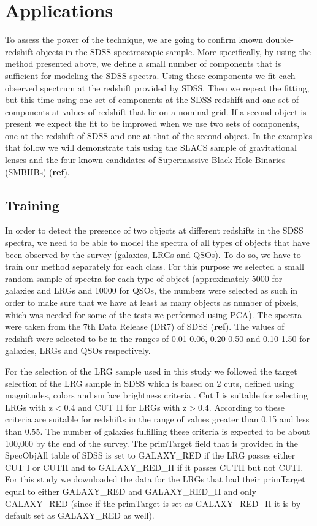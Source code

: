 \documentclass[12pt,preprint]{aastex}
\begin{document}
\section{Applications}\label{sec:applications}
To assess the power of the technique, we are going to confirm known
double-redshift objects in the SDSS spectroscopic sample. More
specifically, by using the method presented above, we define a small
number of components that is sufficient for modeling the SDSS
spectra. Using these components we fit each observed spectrum at the
redshift provided by SDSS. Then we repeat the fitting, but this time
using one set of components at the SDSS redshift and one set of
components at values of redshift that lie on a nominal grid. If a
second object is present we expect the fit to be improved when we use
two sets of components, one at the redshift of SDSS and one at that of
the second object. In the examples that follow we will demonstrate
this using the SLACS sample of gravitational lenses \citep{bolton} and
the four known candidates of Supermassive Black Hole Binaries (SMBHBs)
(\textbf{ref}).

\subsection{Training}\label{sec:training}
In order to detect the presence of two objects at different redshifts
in the SDSS spectra, we need to be able to model the spectra of all
types of objects that have been observed by the survey (galaxies, LRGs
and QSOs). To do so, we have to train our method separately for each
class. For this purpose we selected a small random sample of spectra
for each type of object (approximately 5000 for galaxies and LRGs and
10000 for QSOs, the numbers were selected as such in order to make
sure that we have at least as many objects as number of pixels, which
was needed for some of the tests we performed using PCA). The spectra
were taken from the 7th Data Release (DR7) of SDSS (\textbf{ref}). The
values of redshift were selected to be in the ranges of 0.01-0.06,
0.20-0.50 and 0.10-1.50 for galaxies, LRGs and QSOs respectively.

For the selection of the LRG sample used in this study we followed the
target selection of the LRG sample in SDSS which is based on 2 cuts,
defined using magnitudes, colors and surface brightness criteria
\citep{eisenstein}. Cut I is suitable for selecting LRGs with z$<$0.4
and CUT II for LRGs with z$>$0.4. According to \cite{eisenstein} these
criteria are suitable for redshifts in the range of values greater
than 0.15 and less than 0.55. The number of galaxies fulfilling these
criteria is expected to be about 100,000 by the end of the survey. The
primTarget field that is provided in the SpecObjAll table of SDSS is
set to GALAXY\_RED if the LRG passes either CUT I or CUTII and to
GALAXY\_RED\_II if it passes CUTII but not CUTI. For this study we
downloaded the data for the LRGs that had their primTarget equal to
either GALAXY\_RED and GALAXY\_RED\_II and only GALAXY\_RED (since if
the primTarget is set as GALAXY\_RED\_II it is by default set as
GALAXY\_RED as well).
\end{document}
